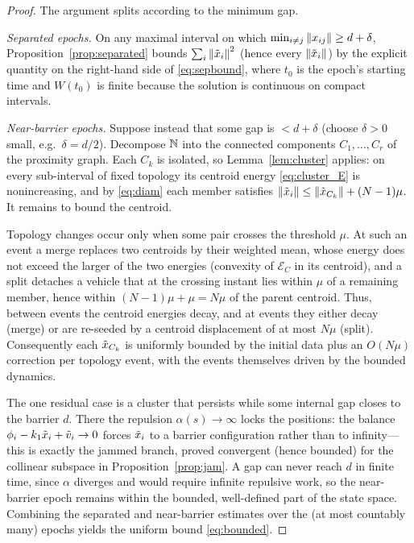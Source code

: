 \begin{proof}
The argument splits according to the minimum gap.

\emph{Separated epochs.} On any maximal interval on which $\min_{i\ne j}\left\| x_{ij} \right\|\ge d+\delta$,
Proposition~\ref{prop:separated} bounds $\sum_i\left\| \tilde{x}_i \right\|^2$ (hence every $\left\| \tilde{x}_i \right\|$) by
the explicit quantity on the right-hand side of \eqref{eq:sepbound}, where $t_0$ is the epoch's
starting time and $W(t_0)$ is finite because the solution is continuous on compact intervals.

\emph{Near-barrier epochs.} Suppose instead that some gap is $<d+\delta$ (choose $\delta>0$ small,
e.g.\ $\delta=d/2$). Decompose $\mathbb{N}$ into the connected components $C_1,\dots,C_r$ of the proximity
graph. Each $C_k$ is isolated, so Lemma~\ref{lem:cluster} applies: on every sub-interval of fixed
topology its centroid energy \eqref{eq:cluster_E} is nonincreasing, and by \eqref{eq:diam} each
member satisfies $\left\| \tilde{x}_i \right\|\le\left\| \tilde{x}_{C_k} \right\|+(N-1)\mu$. It remains to bound the centroid.

Topology changes occur only when some pair crosses the threshold $\mu$. At such an event a merge
replaces two centroids by their weighted mean, whose energy does not exceed the larger of the two
energies (convexity of $\mathcal E_C$ in its centroid), and a split detaches a vehicle that at the
crossing instant lies within $\mu$ of a remaining member, hence within $(N-1)\mu+\mu=N\mu$ of the
parent centroid. Thus, between events the centroid energies decay, and at events they either decay
(merge) or are re-seeded by a centroid displacement of at most $N\mu$ (split). Consequently each
$\tilde{x}_{C_k}$ is uniformly bounded by the initial data plus an $O(N\mu)$ correction per topology
event, with the events themselves driven by the bounded dynamics.

The one residual case is a cluster that persists while some internal gap closes to the barrier
$d$. There the repulsion $\alpha(s)\to\infty$ locks the positions: the balance
$\phi_i-k_1\tilde{x}_i+\tilde{v}_i\to0$ forces $\tilde{x}_i$ to a barrier configuration rather than to
infinity---this is exactly the jammed branch, proved convergent (hence bounded) for the collinear
subspace in Proposition~\ref{prop:jam}. A gap can never reach $d$ in finite time, since $\alpha$
diverges and would require infinite repulsive work, so the near-barrier epoch remains within the
bounded, well-defined part of the state space. Combining the separated and near-barrier estimates
over the (at most countably many) epochs yields the uniform bound \eqref{eq:bounded}.
\end{proof}


